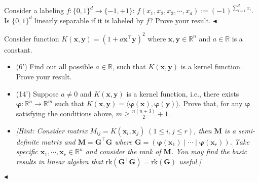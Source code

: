 \documentclass[11pt]{article}
\newenvironment{problem}[2][Problem]{\begin{trivlist}
\item[\hskip \labelsep {\bfseries #1}\hskip \labelsep {\bfseries #2.}]}{\hfill$\blacktriangleleft$\end{trivlist}}
\begin{document}
\begin{problem}{6 (5')}
Consider a labeling $f:\{0,1\}^d\to \{-1,+1\}$: $f(x_1,x_2,x_3,\cdots,x_d):=(-1)^{\sum_{i=1}^d x_i}$. Is $\{0,1\}^d$ linearly separable if it is labeled by $f$? Prove your result.
\end{problem}


\begin{problem}{7 (20')} Consider function $K(\bm x,\bm y)=(1+a\bm x^\top \bm y)^2$ where $\bm x,\bm y\in\mathbb{R}^n$ and $a\in\mathbb{R}$ is a constant.  
\begin{itemize}
    \item [(1)] (6') Find out all possible $a\in\mathbb{R}$, such that $K(\bm x,\bm y)$ is a kernel function. Prove your result.
    \item [(2)] (14') Suppose $a\ne 0$ and $K(\bm x,\bm y)$ is a kernel function, i.e., there exists $\bm \varphi:\mathbb{R}^n\to\mathbb{R}^m$ such that $K(\bm x,\bm y)=\langle \bm \varphi(\bm x),\bm \varphi(\bm y)\rangle$. Prove that, for any $\bm \varphi$ satisfying the conditions above, $m\geq \frac{n(n+3)}{2}+1$.
    \item [] \textit{[Hint: Consider matrix $M_{ij}=K(\bm x_i,\bm x_j)\;(1\leq i,j\leq r)$, then $\bm M$ is a semi-definite matrix and $\bm M=\bm G^\top \bm G$ where $\bm G=(\bm \varphi(\bm x_1)\mid\cdots\mid\bm \varphi(\bm x_r))$. Take specific $\bm x_1,\cdots,\bm x_r\in\mathbb{R}^n$ and consider the rank of $\bm M$. You may find the basic results in linear algebra that $\mathrm{rk}(\bm G^\top \bm G)=\mathrm{rk}(\bm G)$ useful.]}
\end{itemize}
\end{problem}
\end{document}
